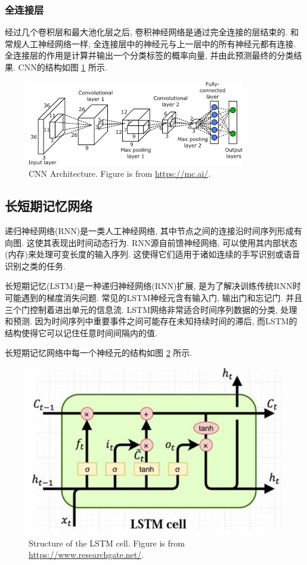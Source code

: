 \documentclass[12pt]{ctexart}
\begin{document}
\subsubsection{全连接层}
经过几个卷积层和最大池化层之后, 卷积神经网络是通过完全连接的层结束的. 和常规人工神经网络一样, 全连接层中的神经元与上一层中的所有神经元都有连接. 全连接层的作用是计算并输出一个分类标签的概率向量, 并由此预测最终的分类结果. CNN的结构如图 \ref{fig3} 所示.
\begin{figure}[H]
  \centering
\includegraphics[scale=.8]{6.png} 
\caption{CNN Architecture. Figure is from \url{https://mc.ai/}.}
\label{fig3}
\end{figure}


\subsection{长短期记忆网络}
\label{lb5}
递归神经网络(RNN)是一类人工神经网络, 其中节点之间的连接沿时间序列形成有向图. 这使其表现出时间动态行为. RNN源自前馈神经网络, 可以使用其内部状态(内存)来处理可变长度的输入序列\cite{ref30}. 这使得它们适用于诸如连续的手写识别\cite{ref31}或语音识别之类的任务\cite{ref32}.

长短期记忆(LSTM)是一种递归神经网络(RNN)扩展, 是为了解决训练传统RNN时可能遇到的梯度消失问题. 
常见的LSTM神经元含有输入门, 输出门和忘记门. 并且三个门控制着进出单元的信息流. LSTM网络非常适合时间序列数据的分类, 处理和预测. 因为时间序列中重要事件之间可能存在未知持续时间的滞后, 而LSTM的结构使得它可以记住任意时间间隔内的值.

长短期记忆网络中每一个神经元的结构如图 \ref{fig5} 所示.
\begin{figure}[H]
  \centering
\includegraphics[scale=.4]{8.png} 
\caption{Structure of the LSTM cell. Figure is from \url{https://www.researchgate.net/}.}
\label{fig5}
\end{figure}
\end{document}

